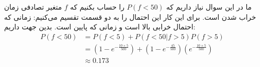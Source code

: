 ما در این سوال نیاز داریم که
$P(f < 50)$
را حساب بکنیم که
$f$
متغیر تصادفی زمان خراب شدن است. برای این کار این احتمال را به دو قسمت تقسیم می‌کنیم:
زمانی که احتمال خرابی بالا است و زمانی که پایین است. بدین جهت داریم:
\begin{align*}
    P(f < 50) &= P(f < 5) + P(f < 50 | f > 5) P(f > 5)\\
    &= (1 - e^{-\frac{10 \times 5}{500}}) + (1 - e^{-\frac{45}{500}}) (e^{-\frac{10 \times 5}{500}})\\
    &\approx 0.173
\end{align*}


